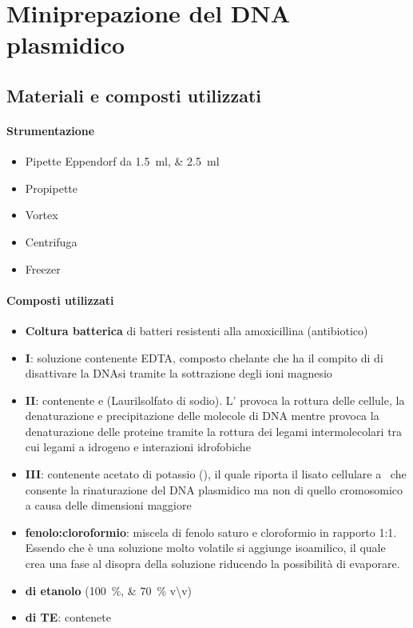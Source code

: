 \section{Miniprepazione del DNA plasmidico}

\subsection{Materiali e composti utilizzati}
\paragraph{Strumentazione}
\begin{itemize}[person]
	\item Pipette \foreignlanguage{german}{Eppendorf} da \qtylist{1.5;2.5}{\ml}
	\item Propipette
	\item \foreignlanguage{english}{Vortex}
	\item Centrifuga
	\item Freezer
\end{itemize}

\paragraph{Composti utilizzati}
\begin{itemize}[person]
	\item \textbf{Coltura batterica} di batteri resistenti alla amoxicillina (antibiotico)
	\item \textbf{\slz I}: soluzione contenente EDTA, composto chelante che ha il compito di di disattivare la DNAsi tramite la sottrazione degli ioni magnesio 
	\item \textbf{\slz II}: contenente  e  (Laurilsolfato di sodio). L' provoca la rottura delle cellule, la denaturazione e precipitazione delle molecole di DNA mentre  provoca la denaturazione delle proteine tramite la rottura dei legami intermolecolari tra cui legami a idrogeno e interazioni idrofobiche
	\item \textbf{\slz III}: contenente acetato di potassio (), il quale riporta il lisato cellulare a \pH\ che consente la rinaturazione del DNA plasmidico ma non di quello cromosomico a causa delle dimensioni maggiore  
	\item \textbf{\slz fenolo:cloroformio}: miscela di fenolo saturo e cloroformio in rapporto 1:1. Essendo che è una soluzione molto volatile si aggiunge isoamilico, il quale crea una fase al disopra della soluzione riducendo la possibilità di evaporare. 
	\item \textbf{\slz di etanolo} (\qtylist{100;70}{\percent} v\textbackslash v)
	\item \textbf{\slz di TE}: contenete
\end{itemize}

